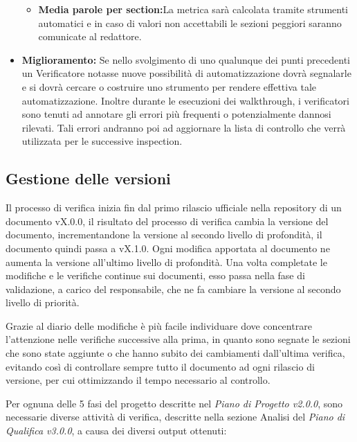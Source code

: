 \documentclass[a4paper]{article}
\begin{document}
\begin{itemize}
\begin{itemize}
					\item \textbf{Media parole per section:}La metrica sarà calcolata tramite strumenti automatici e in caso di valori non accettabili le sezioni peggiori saranno comunicate al redattore.
				\end{itemize}
				\item \textbf{Miglioramento:} Se nello svolgimento di uno qualunque dei punti precedenti un Verificatore
					notasse nuove possibilità di automatizzazione dovrà segnalarle e si dovrà cercare o costruire uno strumento per
					rendere effettiva tale automatizzazione. Inoltre durante le esecuzioni dei walkthrough, i verificatori sono
					tenuti ad annotare gli errori più frequenti o potenzialmente dannosi rilevati. Tali errori andranno poi ad
					aggiornare la lista di controllo che verrà utilizzata per le successive inspection.
			\end{itemize}
		
		\subsection{Gestione delle versioni}
			Il processo di verifica inizia fin dal primo rilascio ufficiale nella repository di un documento vX.0.0, il risultato 
			del processo di verifica cambia la versione del documento, incrementandone la versione al secondo livello di profondità, 
			il documento quindi passa a vX.1.0. Ogni modifica apportata al documento ne aumenta la versione all'ultimo livello di 
			profondità. Una volta completate le modifiche e le verifiche continue sui documenti, esso passa nella fase di validazione,
			a carico del responsabile, che ne fa cambiare la versione al secondo livello di priorità. 
			
			Grazie al diario delle modifiche è più facile individuare dove concentrare l'attenzione nelle verifiche successive 
			alla prima, in quanto sono segnate le sezioni che sono state aggiunte o che hanno subito dei cambiamenti dall'ultima
			 verifica, evitando così di controllare sempre tutto il documento ad ogni rilascio di versione, per cui ottimizzando 
			 il tempo necessario al controllo.

			Per ognuna delle 5 fasi del progetto descritte nel \emph{Piano di Progetto v2.0.0}, sono necessarie diverse attività 
			di verifica, descritte nella sezione Analisi del \emph{Piano di Qualifica v3.0.0}, a causa dei diversi output ottenuti:
\end{document}
